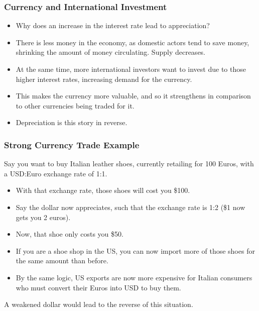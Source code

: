 \documentclass{beamer}
\begin{document}
\begin{frame} 
	\frametitle{\LARGE{Currency and International Investment}}
	\begin{itemize}
		\item Why does an increase in the interest rate lead to appreciation? \pause
		\item There is less money in the economy, as domestic actors tend to save money, shrinking the amount of money circulating. Supply decreases. \pause
		\item At the same time, more international investors want to invest due to those higher interest rates, increasing demand for the currency. \pause
		\item This makes the currency more valuable, and so it strengthens in comparison to other currencies being traded for it. \pause
		\item Depreciation is this story in reverse.
	\end{itemize}
\end{frame}

\begin{frame} 
	\frametitle{\LARGE{Strong Currency Trade Example}}
	Say you want to buy Italian leather shoes, currently retailing for 100 Euros, with a USD:Euro exchange rate of 1:1.
	\begin{itemize}
		\item With that exchange rate, those shoes will cost you \$100. \pause 
		\item Say the dollar now appreciates, such that the exchange rate is 1:2 (\$1 now gets you 2 euros). \pause
		\item Now, that shoe only costs you \$50.
		\item If you are a shoe shop in the US, you can now import more of those shoes for the same amount than before. \pause
		\item By the same logic, US exports are now more expensive for Italian consumers who must convert their Euros into USD to buy them. \pause
	\end{itemize}
	A weakened dollar would lead to the reverse of this situation.
\end{frame}
\end{document}
